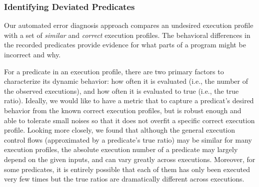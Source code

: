 


\subsubsection{Identifying Deviated Predicates}
\label{sec:deviation}


Our
automated error diagnosis approach compares an undesired execution profile with a set
of \textit{similar} and \textit{correct} execution profiles. 
The behavioral differences in the recorded predicates provide evidence for what parts of a program might be
incorrect and why. %

For a predicate in an execution profile,
there are two primary factors to
characterize its dynamic behavior: how often it is
evaluated (i.e., the number of the
observed executions), and how often it is evaluated to true (i.e., the true ratio).
Ideally, we would like to have a metric that
to capture a predicat's desired behavior
from the known correct execution profiles, but is robust enough and
able to tolerate small noises so that it does
not overfit a specific correct execution profile.
Looking more closely, we found that although
the general execution control flows (approximated by
a predicate's true ratio) may be similar for many 
execution profiles, the absolute execution
number of a predicate may largely depend on the given inputs, and
can vary greatly across executions. Moreover, for
some predicates, it is entirely possible that each of them has
only been executed very few times but the true ratios
are dramatically different across executions.



